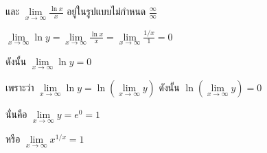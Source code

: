 \documentclass[
]{book}
\begin{document}
และ
\(\displaystyle \mathop {\lim }\limits_{x\to \infty } \frac{\ln x}{x}\)
อยู่ในรูปแบบไม่กำหนด \(\displaystyle \frac{\infty }{\infty }\)

\(\displaystyle \mathop {\lim }\limits_{x\to \infty } \ln y=\mathop {\lim
}\limits_{x\to
\infty } \frac{\ln x}{x}=\mathop {\lim }\limits_{x\to \infty }
\frac{1/x}{1}=0\)

ดังนั้น \(\mathop {\lim }\limits_{x\to \infty } \ln y=0\)

เพราะว่า \(\mathop {\lim }\limits_{x\to \infty } \ln y=\ln (\mathop {\lim
}\limits_{x\to \infty } y)\) ดังนั้น \(\ln (\mathop {\lim }\limits_{x\to
\infty } y)=0\)

นั่นคือ \(\mathop {\lim }\limits_{x\to \infty } y=e^0=1\)

หรือ \(\mathop {\lim }\limits_{x\to \infty } x^{1/x}=1\)

\backmatter
\end{document}
